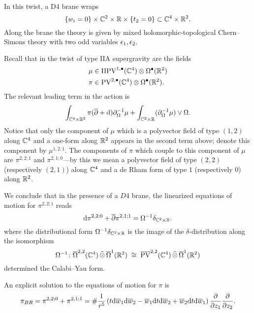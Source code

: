 \documentclass[11pt]{amsart}
\begin{document}
In this twist, a D4 brane wraps 
\[
\{w_i = 0\} \times \mathbb C^2 \times \mathbb R \times \{t_2 = 0\} \subset \mathbb C^4 \times \mathbb R^2 .
\]
Along the brane the theory is given by mixed holomorphic-topological Chern--Simons theory with two odd variables $\epsilon_1,\epsilon_2$. 

Recall that in the twist of type IIA supergravity are the fields
\begin{align*}
\mu & \in \Pi {\rm PV}^{1,\bullet}(\mathbb C^4) \otimes \Omega^\bullet(\mathbb R^2) \\
\pi & \in {\rm PV}^{2,\bullet} (\mathbb C^4) \otimes \Omega^{\bullet}(\mathbb R^2) .
\end{align*} 
The relevant leading term in the action is
\[
\int_{\mathbb C^4 \times \mathbb R^2} \pi (\overline{\partial} + {\rm d}) \partial_{\Omega}^{-1} \mu + \int_{\mathbb C^2 \times \mathbb R} (\partial_{\Omega}^{-1} \mu) \vee \Omega .
\]
Notice that only the component of $\mu$ which is a polyvector field of type $(1,2)$ along $\mathbb C^4$ and a one-form along $\mathbb R^2$ appears in the second term above; denote this component by $\mu^{1,2;1}$.  
The components of $\pi$ which couple to this component of $\mu$ are $\pi^{2,2;1}$ and $\pi^{2,1;0}$---by this we mean a polyvector field of type $(2,2)$ (respectively $(2,1)$) along $\mathbb C^4$ and a de Rham form of type $1$ (respectively $0$) along $\mathbb R^2$.  

We conclude that in the presence of a $D4$ brane, the linearized equations of motion for $\pi^{2,2;1}$ reads
\[
{\rm d} \pi^{2,2;0} + \overline{\partial} \pi^{2,1;1} = \Omega^{-1} \delta_{\mathbb C^2 \times \mathbb R} .
\]
where the distributional form $\Omega^{-1} \delta_{\mathbb C^2 \times \mathbb R}$ is the image of the $\delta$-distribution along the isomorphism
\[
\Omega^{-1} \colon \overline{\Omega}^{2,2} (\mathbb C^4) \, \widehat{\otimes} \, \overline{\Omega}^1 (\mathbb R^2) \; \cong \; \overline{{\rm PV}}^{2,2} (\mathbb C^4) \, \widehat{\otimes} \, \overline{\Omega}^1 (\mathbb R^2) 
\]
determined the Calabi--Yau form. 

An explicit solution to the equations of motion for $\pi$ is 
\[
\pi_{BR} = \pi^{2,2;0} + \pi^{2,1;1} = \# \frac{1}{r^5} \left(t {\rm d} \overline{w}_1 {\rm d} \overline{w}_2 - \overline{w}_1 {\rm d} t {\rm d} \overline{w}_2 + \overline{w}_2 {\rm d} t {\rm d} \overline{w}_1\right) \frac{\partial}{\partial z_1} \frac{\partial}{\partial z_2} .
\]
\end{document}
